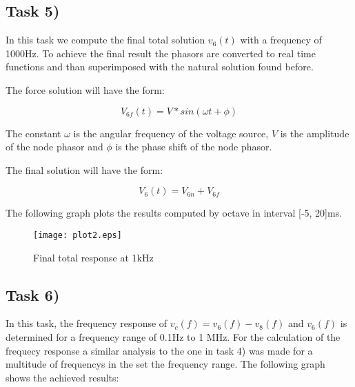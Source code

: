 \subsection{Task 5)}
\label{subsec:task5_a}

In this task we compute the final total solution $v_6(t)$ with a frequency of 1000Hz. To achieve the final result the phasors are converted to real time functions and than superimposed with the natural solution found before.

The force solution will have the form:

\[
V_{6f}(t) = V*sin(\omega t + \phi)
\]

The constant $\omega$ is the angular frequency of the voltage source, $V$ is the amplitude of the node phasor and $\phi$ is the phase shift of the node phasor.

The final solution will have the form:

\[
V_6(t) = V_{6n} + V_{6f}
\]

The following graph plots the results computed by octave in interval [-5, 20]ms.

\begin{figure}[ht]
	\centering
	\texttt{[image: plot2.eps]}
	\caption{Final total response at 1kHz}
\label{fig:Dsnh_sim_t2}
\end{figure}
\newpage
\subsection{Task 6)}
\label{subsec:task6_a}

In this task, the frequency response of $v_c(f)= v_6(f) - v_8(f)$ and $v_6(f)$ is determined for a frequency range of 0.1Hz to 1 MHz. For the calculation of the frequecy response a similar analysis to the one in task 4) was made for a multitude of frequencys in the set the frequency range. The following graph shows the achieved results: 


